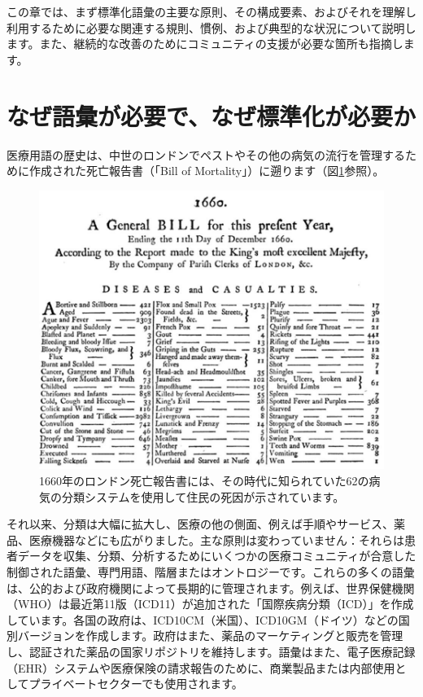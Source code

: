 \documentclass[
  11pt]{book}
\theoremstyle{definition}
\theoremstyle{definition}
\theoremstyle{definition}
\theoremstyle{definition}
\theoremstyle{remark}
\begin{document}
この章では、まず標準化語彙の主要な原則、その構成要素、およびそれを理解し利用するために必要な関連する規則、慣例、および典型的な状況について説明します。また、継続的な改善のためにコミュニティの支援が必要な箇所も指摘します。

\section{なぜ語彙が必要で、なぜ標準化が必要か}\label{ux306aux305cux8a9eux5f59ux304cux5fc5ux8981ux3067ux306aux305cux6a19ux6e96ux5316ux304cux5fc5ux8981ux304b}

医療用語の歴史は、中世のロンドンでペストやその他の病気の流行を管理するために作成された死亡報告書（「Bill of Mortality」）に遡ります（図\ref{fig:bill}参照）。

\begin{figure}

{\centering \includegraphics[width=1\linewidth]{images/StandardizedVocabularies/bill} 

}

\caption{1660年のロンドン死亡報告書には、その時代に知られていた62の病気の分類システムを使用して住民の死因が示されています。}\label{fig:bill}
\end{figure}

それ以来、分類は大幅に拡大し、医療の他の側面、例えば手順やサービス、薬品、医療機器などにも広がりました。主な原則は変わっていません：それらは患者データを収集、分類、分析するためにいくつかの医療コミュニティが合意した制御された語彙、専門用語、階層またはオントロジーです。これらの多くの語彙は、公的および政府機関によって長期的に管理されます。例えば、世界保健機関（WHO）は最近第11版（ICD11）が追加された「国際疾病分類（ICD）」を作成しています。各国の政府は、ICD10CM（米国）、ICD10GM（ドイツ）などの国別バージョンを作成します。政府はまた、薬品のマーケティングと販売を管理し、認証された薬品の国家リポジトリを維持します。語彙はまた、電子医療記録（EHR）システムや医療保険の請求報告のために、商業製品または内部使用としてプライベートセクターでも使用されます。
\end{document}
